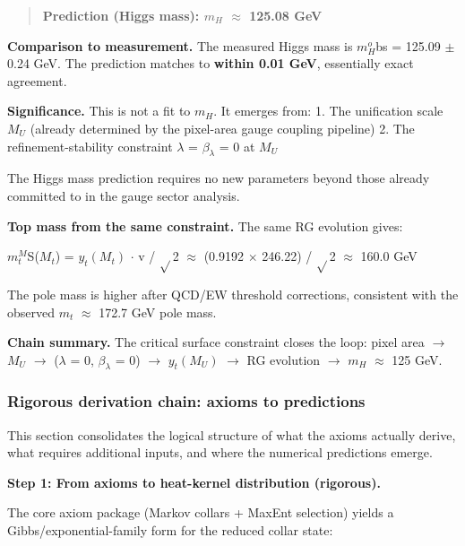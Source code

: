 \documentclass[11pt,a4paper]{article}
\theoremstyle{remark}
\begin{document}
\begin{quote}
\textbf{Prediction (Higgs mass): \(m_H\) \ensuremath{\approx} 125.08 GeV}
\end{quote}

\textbf{Comparison to measurement.} The measured Higgs mass is \(m_H^o\)bs = 125.09 \ensuremath{\pm} 0.24 GeV. The prediction matches to \textbf{within 0.01 GeV}, essentially exact agreement.

\textbf{Significance.} This is not a fit to \(m_H\). It emerges from:
1. The unification scale \(M_U\) (already determined by the pixel-area gauge coupling pipeline)
2. The refinement-stability constraint \ensuremath{\lambda} = \(\ensuremath{\beta}_\ensuremath{\lambda}\) = 0 at \(M_U\)

The Higgs mass prediction requires no new parameters beyond those already committed to in the gauge sector analysis.

\textbf{Top mass from the same constraint.} The same RG evolution gives:

\(m_t^M\)S(\(M_t\)) = \(y_t(M_t)\) \ensuremath{\cdot} v / \ensuremath{\sqrt{}}2 \ensuremath{\approx} (0.9192 \ensuremath{\times} 246.22) / \ensuremath{\sqrt{}}2 \ensuremath{\approx} 160.0 GeV

The pole mass is higher after QCD/EW threshold corrections, consistent with the observed \(m_t\) \ensuremath{\approx} 172.7 GeV pole mass.

\textbf{Chain summary.} The critical surface constraint closes the loop: pixel area \ensuremath{\to} \(M_U\) \ensuremath{\to} (\ensuremath{\lambda} = 0, \(\ensuremath{\beta}_\ensuremath{\lambda}\) = 0) \ensuremath{\to} \(y_t(M_U)\) \ensuremath{\to} RG evolution \ensuremath{\to} \(m_H\) \ensuremath{\approx} 125 GeV.

\subsubsection{Rigorous derivation chain: axioms to predictions}\label{rigorous-derivation-chain-axioms-to-predictions}

This section consolidates the logical structure of what the axioms actually derive, what requires additional inputs, and where the numerical predictions emerge.

\textbf{Step 1: From axioms to heat-kernel distribution (rigorous).}

The core axiom package (Markov collars + MaxEnt selection) yields a Gibbs/exponential-family form for the reduced collar state:
\end{document}
